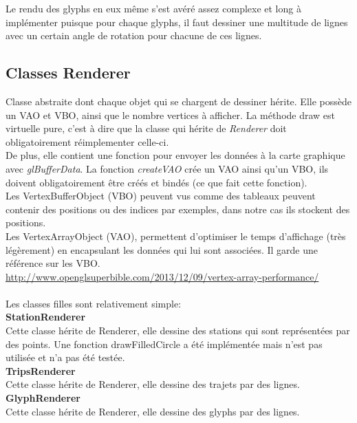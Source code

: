 \documentclass[12pt]{article}
\begin{document}
		Le rendu des glyphs en eux même s’est avéré assez complexe et long à implémenter puisque pour chaque glyphs, il faut dessiner une multitude de lignes avec un certain angle de rotation pour chacune de ces lignes.
		
		\subsection{Classes Renderer}
		Classe abstraite dont chaque objet qui se chargent de dessiner hérite. Elle possède un VAO et VBO, ainsi que le nombre vertices à afficher. La méthode draw est virtuelle pure, c’est à dire que la classe qui hérite de \textit{Renderer} doit obligatoirement réimplementer celle-ci.\\

		De plus, elle contient une fonction pour envoyer les données à la carte graphique avec \textit{glBufferData}. La fonction \textit{createVAO} crée un VAO ainsi qu’un VBO, ils doivent obligatoirement être créés et bindés (ce que fait cette fonction).\\

		Les VertexBufferObject (VBO) peuvent vus comme des tableaux peuvent contenir des positions ou des indices par exemples, dans notre cas ils stockent des positions.\\

		Les VertexArrayObject (VAO), permettent d’optimiser le temps d’affichage (très légèrement) en encapsulant les données qui lui sont associées. Il garde une référence sur les VBO.\\

		\url{http://www.openglsuperbible.com/2013/12/09/vertex-array-performance/}\\ \\
		
		Les classes filles sont relativement simple:\\
		
		\textbf{StationRenderer}\\
		Cette classe hérite de Renderer, elle dessine des stations qui sont représentées par des points. Une fonction drawFilledCircle a été implémentée mais n’est pas utilisée et n’a pas été testée.\\
		
		\textbf{TripsRenderer}\\
		Cette classe hérite de Renderer, elle dessine des trajets par des lignes. \\

		\textbf{GlyphRenderer}\\
		Cette classe hérite de Renderer, elle dessine des glyphs par des lignes. \\
		
\end{document}

